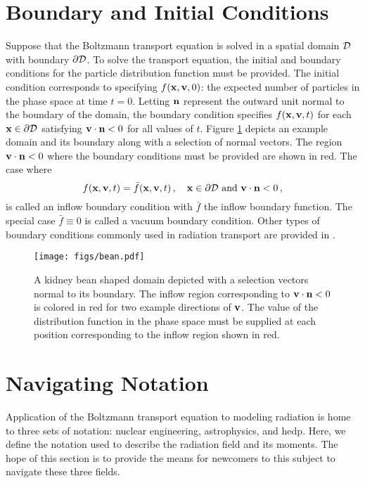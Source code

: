 \documentclass[../doc.tex]{subfiles}
\begin{document}
\section{Boundary and Initial Conditions}
Suppose that the Boltzmann transport equation is solved in a spatial domain $\mathcal{D}$ with boundary $\partial\mathcal{D}$. To solve the transport equation, the initial and boundary conditions for the particle distribution function must be provided. The initial condition corresponds to specifying $f(\boldsymbol{\mathrm{x}},\boldsymbol{\mathrm{v}},0)$: the expected number of particles in the phase space at time $t=0$. Letting $\boldsymbol{\mathrm{n}}$ represent the outward unit normal to the boundary of the domain, the boundary condition specifies $f(\boldsymbol{\mathrm{x}},\boldsymbol{\mathrm{v}},t)$ for each $\boldsymbol{\mathrm{x}}\in\partial\mathcal{D}$ satisfying $\boldsymbol{\mathrm{v}}\cdot\boldsymbol{\mathrm{n}}<0$ for all values of $t$. Figure \ref{trans:inflow_diag} depicts an example domain and its boundary along with a selection of normal vectors. The region $\boldsymbol{\mathrm{v}}\cdot\boldsymbol{\mathrm{n}}<0$ where the boundary conditions must be provided are shown in red. The case where 
	\begin{equation} \label{trans:gen_inflow}
		f(\x,\v,t) = \bar{f}(\x,\v,t) \,, \quad \x \in \partial\D \ \mathrm{and} \ \v \cdot \n < 0 \,, 
	\end{equation}
is called an inflow boundary condition with $\bar{f}$ the inflow boundary function. The special case $\bar{f} \equiv 0$ is called a vacuum boundary condition. Other types of boundary conditions commonly used in radiation transport are provided in \cite[\S 1.3]{neutron_transport_LM}.
\begin{figure}
\centering
\texttt{[image: figs/bean.pdf]}
\caption{A kidney bean shaped domain depicted with a selection vectors normal to its boundary. The inflow region corresponding to $\boldsymbol{\mathrm{v}}\cdot\boldsymbol{\mathrm{n}}<0$ is colored in red for two example directions of $\boldsymbol{\mathrm{v}}$. The value of the distribution function in the phase space must be supplied at each position corresponding to the inflow region shown in red.}
\label{trans:inflow_diag}
\end{figure}

\section{Navigating Notation}
Application of the Boltzmann transport equation to modeling radiation is home to three sets of notation: nuclear engineering, astrophysics, and \gls{hedp}. Here, we define the notation used to describe the radiation field and its moments. The hope of this section is to provide the means for newcomers to this subject to navigate these three fields. 
\end{document}

